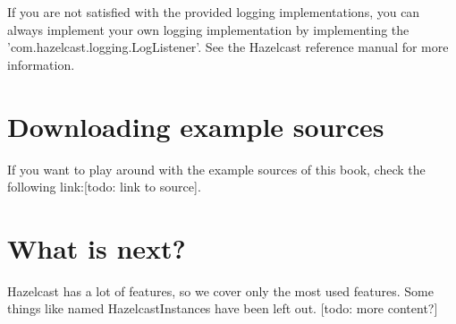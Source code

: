 If you are not satisfied with the provided logging implementations, you can always implement your own logging implementation by implementing the 'com.hazelcast.logging.LogListener'. See the Hazelcast reference manual for more information.

\section{Downloading example sources}
If you want to play around with the example sources of this book, check the following link:[todo: link to source]. 

\section{What is next?}
Hazelcast has a lot of features, so we cover only the most used features. Some things like named HazelcastInstances have been left out. [todo: more content?]
